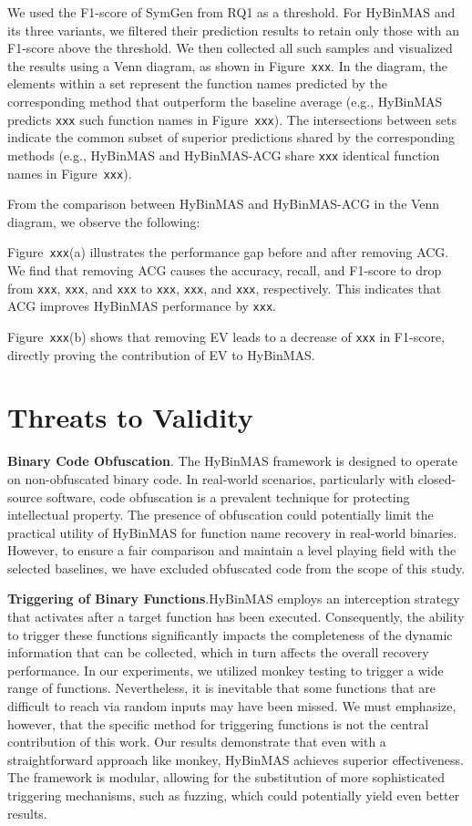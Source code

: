 \documentclass[acmsmall,screen,review,anonymous]{acmart} %
\begin{document}
We used the F1-score of SymGen from RQ1 as a threshold. For HyBinMAS and its three variants, we filtered their prediction results to retain only those with an F1-score above the threshold. We then collected all such samples and visualized the results using a Venn diagram, as shown in Figure~\texttt{xxx}. In the diagram, the elements within a set represent the function names predicted by the corresponding method that outperform the baseline average (e.g., HyBinMAS predicts \texttt{xxx} such function names in Figure~\texttt{xxx}). The intersections between sets indicate the common subset of superior predictions shared by the corresponding methods (e.g., HyBinMAS and HyBinMAS-ACG share \texttt{xxx} identical function names in Figure~\texttt{xxx}).

From the comparison between HyBinMAS and HyBinMAS-ACG in the Venn diagram, we observe the following:

Figure~\texttt{xxx}(a) illustrates the performance gap before and after removing ACG. We find that removing ACG causes the accuracy, recall, and F1-score to drop from \texttt{xxx}, \texttt{xxx}, and \texttt{xxx} to \texttt{xxx}, \texttt{xxx}, and \texttt{xxx}, respectively. This indicates that ACG improves HyBinMAS performance by \texttt{xxx}.

Figure~\texttt{xxx}(b) shows that removing EV leads to a decrease of \texttt{xxx} in F1-score, directly proving the contribution of EV to HyBinMAS.




\section{Threats to Validity}
\textbf{Binary Code Obfuscation}. The HyBinMAS framework is designed to operate on non-obfuscated binary code. In real-world scenarios, particularly with closed-source software, code obfuscation is a prevalent technique for protecting intellectual property. The presence of obfuscation could potentially limit the practical utility of HyBinMAS for function name recovery in real-world binaries. However, to ensure a fair comparison and maintain a level playing field with the selected baselines\cite{SymGen, XFL}, we have excluded obfuscated code from the scope of this study.

\textbf{Triggering of Binary Functions}.HyBinMAS employs an interception strategy that activates after a target function has been executed. Consequently, the ability to trigger these functions significantly impacts the completeness of the dynamic information that can be collected, which in turn affects the overall recovery performance. In our experiments, we utilized monkey testing to trigger a wide range of functions. Nevertheless, it is inevitable that some functions that are difficult to reach via random inputs may have been missed. We must emphasize, however, that the specific method for triggering functions is not the central contribution of this work. Our results demonstrate that even with a straightforward approach like monkey, HyBinMAS achieves superior effectiveness. The framework is modular, allowing for the substitution of more sophisticated triggering mechanisms, such as fuzzing, which could potentially yield even better results.
\end{document}
